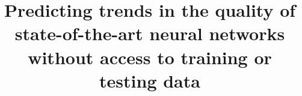 \documentclass[sigconf]{acmart}
\begin{document}
\title{%
Predicting trends in the quality of state-of-the-art neural networks without access to training or testing data
}




\begin{abstract}

\end{abstract}
\end{document}

